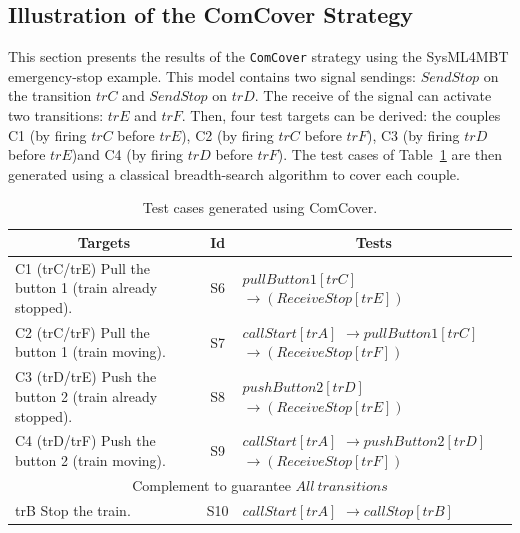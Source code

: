 \documentclass{llncs}
\begin{document}
\subsection{Illustration of the ComCover Strategy}
\vspace*{-.25cm}
This section presents the results of the \texttt{ComCover} strategy
using the SysML4MBT emergency-stop example. This model contains two
signal sendings: $SendStop$ on the transition $trC$ and $SendStop$ on
$trD$. The receive of the signal can activate two transitions: $trE$
and $trF$. Then, four test targets can be derived: the couples C1 (by
firing $trC$ before $trE$), C2 (by firing $trC$ before $trF$), C3 (by
firing $trD$ before $trE$)and C4 (by firing $trD$ before $trF$).
The test cases of Table~\ref{genSysML4MBT-jouet} are then generated
using a classical breadth-search algorithm to cover each
couple. 

\begin{table}[htp]
\centering
\vspace*{-.25cm}
\caption{Test cases generated using ComCover.}

\begin{tabular}{|m{3.4cm}|c| m{3.2cm}|}
	\hline
	\multicolumn{1}{|c}{Targets} & \multicolumn{1}{|c|}{Id} & \multicolumn{1}{|c|}{Tests}
	\\ \hline
	C1 (trC/trE) \newline Pull the button 1 \newline (train already stopped).
	&S6& $pullButton1 [trC]$\newline
	$\rightarrow (ReceiveStop [trE])$
	\\ \hline
	C2 (trC/trF) \newline Pull the button 1 \newline (train moving).
	&S7& $callStart [trA]$\newline
	$\rightarrow pullButton1 [trC]$\newline
	$\rightarrow (ReceiveStop [trF])$
	\\ \hline
	C3 (trD/trE) \newline Push the button 2 \newline (train already stopped).
	&S8& $pushButton2 [trD]$\newline
	$\rightarrow (ReceiveStop [trE])$
	\\ \hline
	C4 (trD/trF) \newline Push the button 2 \newline (train moving).
	&S9& $callStart [trA]$\newline
	$\rightarrow pushButton2 [trD]$\newline
	$\rightarrow (ReceiveStop [trF])$
	\\ \hline
	\multicolumn{3}{|c|}{Complement to guarantee $All~transitions$}
	\\ \hline
	trB \newline Stop the train.
	&S10&$callStart[trA]$\newline
	$\rightarrow callStop [trB]$
	\\ \hline
\end{tabular}
\vspace*{-.35cm}
\label{genSysML4MBT-jouet}
\end{table}
\end{document}
